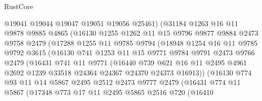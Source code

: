 \begin{lexlean}{RustCore}
\begin{coremodule}
                @19041
                @19044
                @19047
                @19051
                @19056
                @25461)
              (@31184
                @1263
                @16
                @11
                @9878
                @9885
                @4865
                (@16130
                  @1255
                  @1262
                  @11
                  @15
                  @9796
                  @9877
                  @9884
                  @2473
                  @9758
                  @2479
                  (@17288
                    @1255
                    @11
                    @9785
                    @9794
                    (@18948
                      @1254
                      @16
                      @11
                      @9785
                      @9792
                      @3615
                      (@16130
                        @741
                        @1253
                        @11
                        @15
                        @9771
                        @9784
                        @9791
                        @2473
                        @9766
                        @2479
                        (@16431
                          @741
                          @11
                          @9771
                          (@16440
                            @739
                            @621
                            @16
                            @11
                            @2495
                            @4961
                            @2692
                            @1239
                            @33518
                            @24364
                            @24367
                            @24370
                            @24373
                            @16913))
                        (@16130
                          @774
                          @93
                          @11
                          @14
                          @5867
                          @2495
                          @2512
                          @2473
                          @9777
                          @2479
                          (@16431
                            @774
                            @11
                            @5867
                            (@17348
                              @773
                              @17
                              @11
                              @2495
                              @5865
                              @2516
                              @720
                              (@16410

\end{coremodule}
\end{lexlean}
